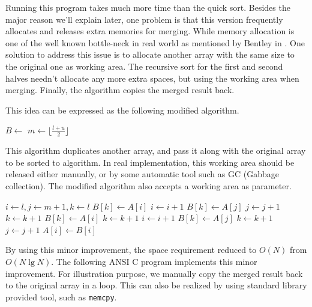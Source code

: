 \documentclass{article}
\begin{document}
Running this program takes much more time than the quick sort. Besides the major reason we'll explain later,
one problem is that this version frequently allocates and releases extra memories for merging. While memory
allocation is one of the well known bottle-neck in real world as mentioned by Bentley in \cite{pearls}.
One solution to address this issue is to allocate another array with the same size to the original one
as working area. The recursive sort for the first and second halves needn't allocate any more
extra spaces, but using the working area when merging. Finally, the algorithm copies
the merged result back.

This idea can be expressed as the following modified algorithm.

\begin{algorithmic}
  \State $B \gets $ 
  \State {}
\EndProcedure
\Statex
{}
    \State $m \gets \lfloor \frac{l + u}{2} \rfloor$
    \State {}
    \State {}
    \State {}
  \EndIf
\EndProcedure
\end{algorithmic}

This algorithm duplicates another array, and pass it along with the original array to be sorted
to  algorithm. In real implementation, this working area should be released
either manually, or by some automatic tool such as GC (Gabbage collection).
The modified algorithm  also accepts a working area as parameter.

\begin{algorithmic}
  \State $i \gets l, j \gets m + 1, k \gets l$
      \State $B[k] \gets A[i]$
      \State $i \gets i + 1$
    \Else
      \State $B[k] \gets A[j]$
      \State $j \gets j + 1$
    \EndIf
    \State $k \gets k + 1$
  \EndWhile
    \State $B[k] \gets A[i]$
    \State $k \gets k + 1$
    \State $i \gets i + 1$
  \EndWhile
    \State $B[k] \gets A[j]$
    \State $k \gets k + 1$
    \State $j \gets j + 1$
  \EndWhile
   
    \State $A[i] \gets B[i]$
  \EndFor
\EndProcedure
\end{algorithmic}

By using this minor improvement, the space requirement reduced to $O(N)$ from $O(N \lg N)$.
The following ANSI C program implements this minor improvement. For illustration purpose,
we manually copy the merged result back to the original array in a loop. This can also
be realized by using standard library provided tool, such as \verb|memcpy|.
\end{document}

